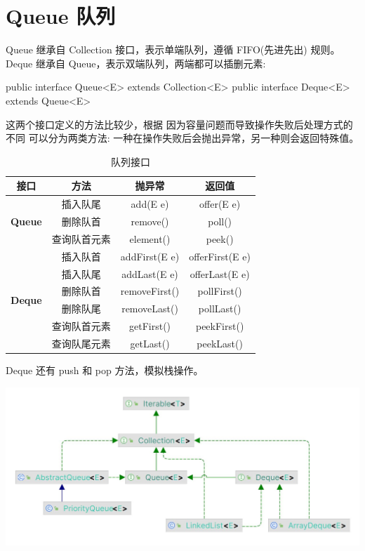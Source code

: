 \section{Queue 队列}

Queue 继承自 Collection 接口，表示单端队列，遵循 FIFO(先进先出) 规则。Deque 继承自 Queue，表示双端队列，两端都可以插删元素:

\begin{Java}
public interface Queue<E> extends Collection<E>
public interface Deque<E> extends Queue<E>
\end{Java}

这两个接口定义的方法比较少，根据 因为容量问题而导致操作失败后处理方式的不同 可以分为两类方法: 一种在操作失败后会抛出异常，另一种则会返回特殊值。

\begin{table}[H]
    \centering
    \small
    \caption{队列接口}
    \label{table:队列接口}
    \setlength{\tabcolsep}{4mm}
    \begin{tabular}{c|c|cc}
        \toprule
        \textbf{接口} & \textbf{方法} & \textbf{抛异常} & \textbf{返回值} \\
        \midrule
        \multirow{3}{*}{\textbf{Queue}} & 插入队尾 & add(E e) & offer(E e) \\
        & 删除队首 & remove() & poll() \\
        & 查询队首元素 & element() & peek() \\
        \midrule
        \multirow{6}{*}{\textbf{Deque}} & 插入队首 & addFirst(E e) & offerFirst(E e) \\
        & 插入队尾 & addLast(E e) & offerLast(E e) \\
        & 删除队首 & removeFirst() & pollFirst() \\
        & 删除队尾 & removeLast() & pollLast() \\
        & 查询队首元素 & getFirst() & peekFirst() \\
        & 查询队尾元素 & getLast() & peekLast() \\
        \bottomrule
    \end{tabular}
\end{table}

Deque 还有 push 和 pop 方法，模拟栈操作。

\begin{center}
    \includegraphics[width=0.7\linewidth]{../../../imgs/Queue.jpg}
\end{center}

